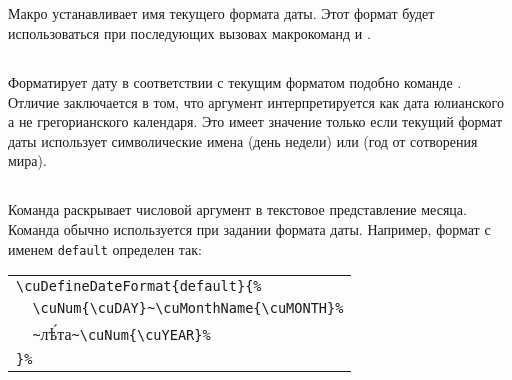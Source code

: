 \begin{RU}
\subsection{}
Макро устанавливает имя текущего формата даты. Этот формат будет использоваться при последующих вызовах макрокоманд
 и .

\subsection{}
Форматирует дату в соответствии с текущим форматом подобно команде . Отличие заключается в том, что аргумент
интерпретируется как дата юлианского а не грегорианского календаря. Это имеет значение только если текущий формат даты
использует символические имена  (день недели) или  (год от сотворения мира).

\subsection{}
Команда раскрывает числовой аргумент в текстовое представление месяца. Команда обычно используется при задании формата
даты. Например, формат с именем \texttt{default} определен так:
\end{RU}
%
\begin{center}
\begin{churchslavonic}
\begin{tabular}{l}
\verb+\cuDefineDateFormat{default}{%+\\
\verb+  \cuNum{\cuDAY}~\cuMonthName{\cuMONTH}%+\\
\verb+  ~+лѣ́та\verb+~\cuNum{\cuYEAR}%+\\
\verb+}%+\\
\end{tabular}
\end{churchslavonic}
\end{center}

